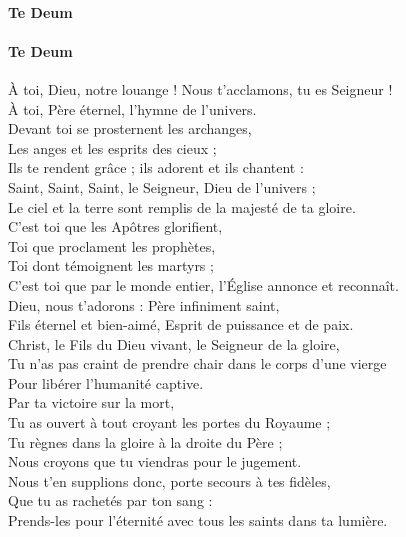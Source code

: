 \documentclass[twoside]{article}
\begin{document}
\begin{paracol}[1]{2}
\paragraph{Te Deum}
	

\switchcolumn

\paragraph{Te Deum}

À toi, Dieu, notre louange ! Nous t’acclamons, tu es Seigneur !\\
À toi, Père éternel, l’hymne de l’univers.\\
Devant toi se prosternent les archanges, \\
Les anges et les esprits des cieux ;\\
Ils te rendent grâce ; ils adorent et ils chantent :\\
Saint, Saint, Saint, le Seigneur, Dieu de l’univers ;\\
Le ciel et la terre sont remplis de la majesté de ta gloire.\\
C’est toi que les Apôtres glorifient,\\
Toi que proclament les prophètes,\\
Toi dont témoignent les martyrs ;\\
C’est toi que par le monde entier, l’Église annonce et reconnaît.\\
Dieu, nous t’adorons : Père infiniment saint,\\
Fils éternel et bien-aimé, Esprit de puissance et de paix.\\
Christ, le Fils du Dieu vivant, le Seigneur de la gloire,\\
Tu n’as pas craint de prendre chair dans le corps d’une vierge\\
Pour libérer l’humanité captive.\\
Par ta victoire sur la mort, \\
Tu as ouvert à tout croyant les portes du Royaume ;\\
Tu règnes dans la gloire à la droite du Père ;\\
Nous croyons que tu viendras pour le jugement.\\
Nous t'en supplions donc, porte secours à tes fidèles,\\
Que tu as rachetés par ton sang :\\
Prends-les pour l'éternité avec tous les saints dans ta lumière.\\

\end{paracol}
\end{document}
